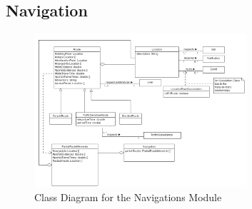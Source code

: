 \documentclass[runningheads,a4paper]{article}
\begin{document}
\subsection {Navigation}

\begin{figure}[H]
   	\centering
   	\includegraphics[width=0.7\textwidth]{Navigation-Module-Class-Diagram.png}
   	\caption{Class Diagram for the Navigations Module}
\end{figure}
\end{document}
